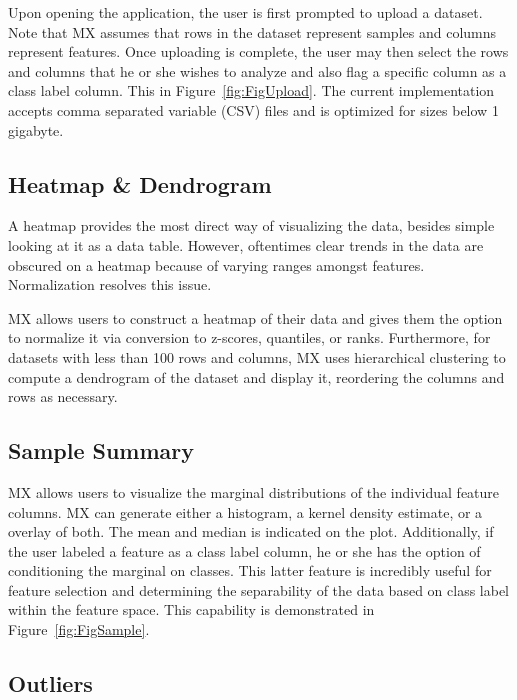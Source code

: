 \documentclass[12pt]{article}
\begin{document}
Upon opening the application, the user is first prompted to upload a dataset. Note that MX assumes that rows in the dataset represent samples and columns represent features. Once uploading is complete, the user may then select the rows and columns that he or she wishes to analyze and also flag a specific column as a class label column. This in Figure~\ref{fig:FigUpload}. The current implementation accepts comma separated variable (CSV) files and is optimized for sizes below 1 gigabyte.

\subsection{Heatmap \& Dendrogram}
\label{subsec:SubSecHeatmap}

A heatmap provides the most direct way of visualizing the data, besides simple looking at it as a data table. However, oftentimes clear trends in the data are obscured on a heatmap because of varying ranges amongst features. Normalization resolves this issue.

MX allows users to construct a heatmap of their data and gives them the option to normalize it via conversion to z-scores, quantiles, or ranks. Furthermore, for datasets with less than 100 rows and columns, MX uses hierarchical clustering to compute a dendrogram of the dataset and display it, reordering the columns and rows as necessary.

\subsection{Sample Summary}
\label{subsec:SubSecSample}

MX allows users to visualize the marginal distributions of the individual feature columns. MX can generate either a histogram, a kernel density estimate, or a overlay of both. The mean and median is indicated on the plot. Additionally, if the user labeled a feature as a class label column, he or she has the option of conditioning the marginal on classes. This latter feature is incredibly useful for feature selection and determining the separability of the data based on class label within the feature space. This capability is demonstrated in Figure~\ref{fig:FigSample}. 

\subsection{Outliers}
\label{subsec:SubSecOutliers}
\end{document}
